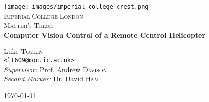 \newcommand{\HRule}{\rule{\linewidth}{0.5mm}}

\begin{titlepage}
\begin{center}
\texttt{[image: images/imperial\_college\_crest.png]}\\[0.45cm]  
\textsc{\LARGE Imperial College London}\\[1cm]
\textsc{\Large Master's Thesis}\\[0.5cm]

\vspace{0.4cm}
{ \LARGE \bfseries Computer Vision Control of a Remote Control Helicopter}\\[0.4cm]
\vspace{1.5cm}

{Luke \textsc{Tomlin}} \\
\href{mailto:lt609@doc.ic.ac.uk}{\nolinkurl{<lt609@doc.ic.ac.uk>}} \\
\vspace{40pt}
\emph{Supervisor:} \href{mailto:ajd@doc.ic.ac.uk}{Prof. Andrew \textsc{Davison}} \\
\emph{Second Marker:} \href{mailto:david.ham@imperial.ac.uk}{Dr. David \textsc{Ham}}
\vfill

{\large \today}
\end{center}
\end{titlepage}

\newpage{}
\thispagestyle{empty}
\mbox{}
